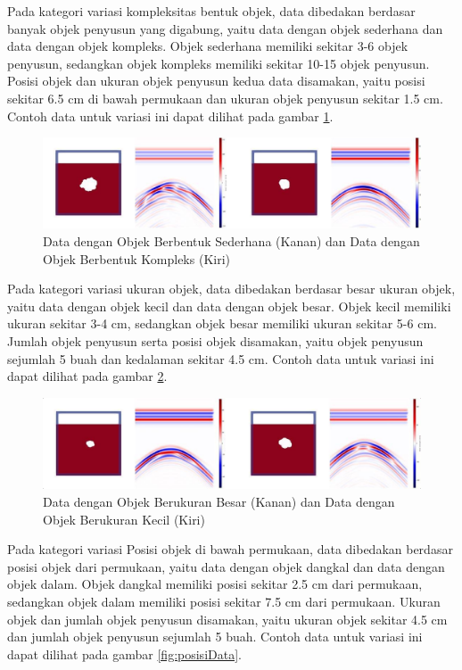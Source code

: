 \documentclass[conference]{IEEEtran}
\begin{document}
Pada kategori variasi kompleksitas bentuk objek, data dibedakan berdasar banyak objek penyusun yang digabung, yaitu data dengan objek sederhana dan data dengan objek kompleks. 
Objek sederhana memiliki sekitar 3-6 objek penyusun, sedangkan objek kompleks memiliki sekitar 10-15 objek penyusun. 
Posisi objek dan ukuran objek penyusun kedua data disamakan, yaitu posisi sekitar 6.5 cm di bawah permukaan dan ukuran objek penyusun sekitar 1.5 cm. 
Contoh data untuk variasi ini dapat dilihat pada gambar \ref{fig:kompleksData}.

\begin{figure}[ht]
  \centering
  \includegraphics[scale=0.2]{gambar/variasi kompleksitas.png}
  \caption{Data dengan Objek Berbentuk Sederhana (Kanan) dan Data dengan Objek Berbentuk Kompleks (Kiri)}
  \label{fig:kompleksData}
\end{figure}

Pada kategori variasi ukuran objek, data dibedakan berdasar besar ukuran objek, yaitu data dengan objek kecil dan data dengan objek besar. 
Objek kecil memiliki ukuran sekitar 3-4 cm, sedangkan objek besar memiliki ukuran sekitar 5-6 cm. 
Jumlah objek penyusun serta posisi objek disamakan, yaitu objek penyusun sejumlah 5 buah dan kedalaman sekitar 4.5 cm. 
Contoh data untuk variasi ini dapat dilihat pada gambar \ref{fig:ukuranData}.

\begin{figure}[ht]
  \centering
  \includegraphics[scale=0.2]{gambar/variasi ukuran.png}
  \caption{Data dengan Objek Berukuran Besar (Kanan) dan Data dengan Objek Berukuran Kecil (Kiri)}
  \label{fig:ukuranData}
\end{figure}

Pada kategori variasi Posisi objek di bawah permukaan, data dibedakan berdasar posisi objek dari permukaan, yaitu data dengan objek dangkal dan data dengan objek dalam. 
Objek dangkal memiliki posisi sekitar 2.5 cm dari permukaan, sedangkan objek dalam memiliki posisi sekitar 7.5 cm dari permukaan. 
Ukuran objek dan jumlah objek penyusun disamakan, yaitu ukuran objek sekitar 4.5 cm dan jumlah objek penyusun sejumlah 5 buah. 
Contoh data untuk variasi ini dapat dilihat pada gambar \ref{fig:posisiData}.
\end{document}
